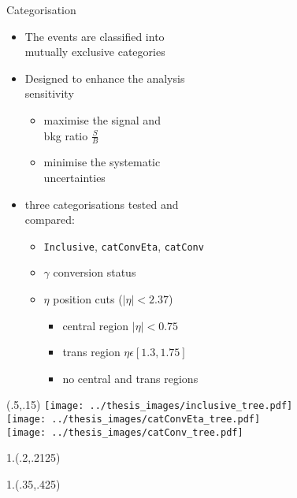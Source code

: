 \documentclass[10pt,UKenglish, leqno, xcolor = dvipsnames]{beamer}
\begin{document}
	\begin{frame}{Categorisation}
		\vfill
		\begin{itemize}
			\item The events are classified into\\ mutually exclusive categories
			\item Designed to enhance the analysis\\ sensitivity
			\begin{itemize}
				\item maximise the signal and\\ bkg ratio $\frac{S}{B}$
				\item minimise the systematic\\ uncertainties
			\end{itemize}
			\item three categorisations tested and\\ compared:
			\begin{itemize}
				\item \texttt{Inclusive}, \texttt{catConvEta}, \texttt{catConv}
				\item $\gamma$ conversion status 
				\item $\eta$ position cuts ($|\eta|<2.37$)
				\begin{itemize}
					\item central region $|\eta|<0.75$
					\item trans region $ \eta \epsilon [1.3,1.75]$
					\item no central and trans regions
				\end{itemize}
			\end{itemize}
		\end{itemize}
		\begin{textblock}{1}(.5,.15)
			\texttt{[image: ../thesis\_images/inclusive\_tree.pdf]}\\
			\texttt{[image: ../thesis\_images/catConvEta\_tree.pdf]}\\
			\texttt{[image: ../thesis\_images/catConv\_tree.pdf]}\\	
		\end{textblock}	
		\vfill
		\begin{textblock}{1.}(.2,.2125)
		\end{textblock}
		\begin{textblock}{1.}(.35,.425)

\end{textblock}
\end{frame}
\end{document}
